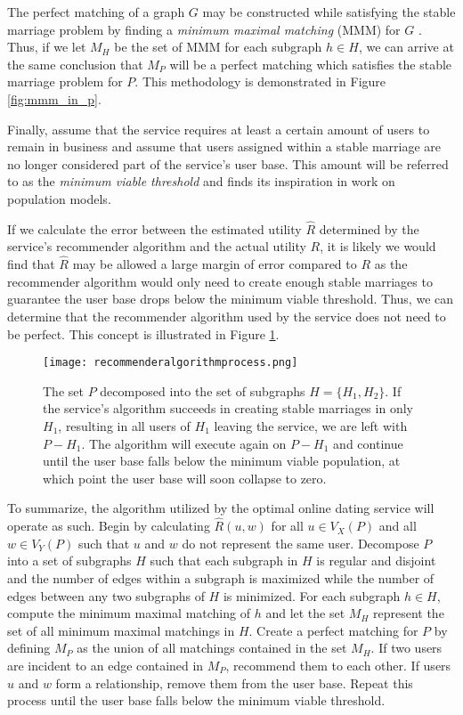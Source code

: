 The perfect matching of a graph $G$ may be constructed while satisfying the stable marriage problem by finding a \textit{minimum maximal matching} (MMM) for $G$ \citep{Demange2008}. Thus, if we let $M_{H}$ be the set of MMM for each subgraph $h \in H$, we can arrive at the same conclusion that $M_{P}$ will be a perfect matching which satisfies the stable marriage problem for $P$. This methodology is demonstrated in Figure \ref{fig:mmm_in_p}.

Finally, assume that the service requires at least a certain amount of users to remain in business and assume that users assigned within a stable marriage are no longer considered part of the service's user base. This amount will be referred to as the \textit{minimum viable threshold} and finds its inspiration in work on population models.

If we calculate the error between the estimated utility $\hat{R}$ determined by the service's recommender algorithm and the actual utility $R$, it is likely we would find that $\hat{R}$ may be allowed a large margin of error compared to $R$ as the recommender algorithm would only need to create enough stable marriages to guarantee the user base drops below the minimum viable threshold. Thus, we can determine that the recommender algorithm used by the service does not need to be perfect. This concept is illustrated in Figure \ref{fig:algorithmprocess}.

\begin{figure}[t]
    \centering
    \texttt{[image: recommenderalgorithmprocess.png]}
    \caption{The set $P$ decomposed into the set of subgraphs $H = \{H_{1}, H_{2}\}$. If the service's algorithm succeeds in creating stable marriages in only $H_{1}$, resulting in all users of $H_{1}$ leaving the service, we are left with $P - H_{1}$. The algorithm will execute again on $P - H_{1}$ and continue until the user base falls below the minimum viable population, at which point the user base will soon collapse to zero.}
    \label{fig:algorithmprocess}
\end{figure}

To summarize, the algorithm utilized by the optimal online dating service will operate as such. Begin by calculating $\hat{R}(u, w)$ for all $u \in V_{X}(P)$ and all $w\in V_{Y}(P)$ such that $u$ and $w$ do not represent the same user. Decompose $P$ into a set of subgraphs $H$ such that each subgraph in $H$ is regular and disjoint and the number of edges within a subgraph is maximized while the number of edges between any two subgraphs of $H$ is minimized. For each subgraph $h \in H$, compute the minimum maximal matching of $h$ and let the set $M_{H}$ represent the set of all minimum maximal matchings in $H$. Create a perfect matching for $P$ by defining $M_{P}$ as the union of all matchings contained in the set $M_{H}$. If two users are incident to an edge contained in $M_{P}$, recommend them to each other. If users $u$ and $w$ form a relationship, remove them from the user base. Repeat this process until the user base falls below the minimum viable threshold.
